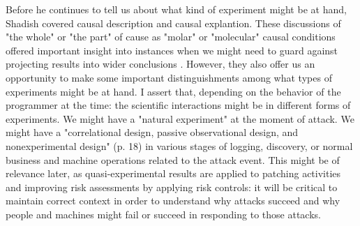 Before he continues to tell us about what kind of experiment might be at hand, Shadish covered causal description and causal explantion. These discussions of "the whole" or "the part" of cause as "molar" or "molecular" causal conditions offered important insight into instances when we might need to guard against projecting results into wider conclusions . However, they also offer us an opportunity to make some important distinguishments among what types of experiments might be at hand. I assert that, depending on the behavior of the programmer at the time: the scientific interactions might be in different forms of experiments. We might have a "natural experiment" at the moment of \gls{attack}. We might have a "correlational design, passive observational design, and nonexperimental design" (p. 18) in various stages of logging, discovery, or normal business and machine operations related to the \gls{attack} event. This might be of relevance later, as quasi-experimental results are applied to patching activities and improving risk assessments by applying risk controls: it will be critical to maintain correct context in order to understand why attacks succeed and why people and machines might fail or succeed in responding to those attacks.


